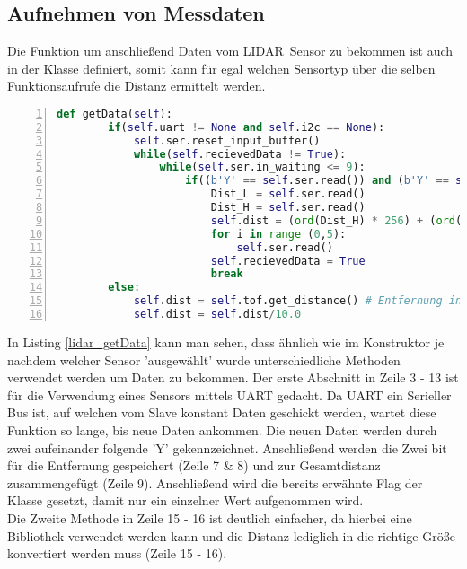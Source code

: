 \subsection{Aufnehmen von Messdaten}
Die Funktion um anschließend Daten vom \ac{LIDAR} Sensor zu bekommen ist auch in der Klasse definiert, somit kann für egal welchen Sensortyp über die selben Funktionsaufrufe die Distanz ermittelt werden. 
\begin{lstlisting}[caption={Funktion um Distanz vom \ac{LIDAR} Sensor zu erhalten}, language={Python}, label={lidar_getData}, numbers=left]
	def getData(self):
        if(self.uart != None and self.i2c == None):
            self.ser.reset_input_buffer()
            while(self.recievedData != True):
                while(self.ser.in_waiting <= 9):
                    if((b'Y' == self.ser.read()) and (b'Y' == self.ser.read())):
                        Dist_L = self.ser.read()
                        Dist_H = self.ser.read()
                        self.dist = (ord(Dist_H) * 256) + (ord(Dist_L))
                        for i in range (0,5):
                            self.ser.read()
                        self.recievedData = True
                        break
        else:
            self.dist = self.tof.get_distance() # Entfernung in mm
            self.dist = self.dist/10.0
\end{lstlisting}
In Listing \ref{lidar_getData} kann man sehen, dass ähnlich wie im Konstruktor je nachdem welcher Sensor 'ausgewählt' wurde unterschiedliche Methoden verwendet werden um Daten zu bekommen. Der erste Abschnitt in Zeile 3 - 13 ist für die Verwendung eines Sensors mittels \ac{UART} gedacht. Da \ac{UART} ein Serieller Bus ist, auf welchen vom Slave konstant Daten geschickt werden, wartet diese Funktion so lange, bis neue Daten ankommen. Die neuen Daten werden durch zwei aufeinander folgende 'Y' gekennzeichnet. Anschließend werden die Zwei bit für die Entfernung gespeichert (Zeile 7 \& 8) und zur Gesamtdistanz zusammengefügt (Zeile 9). Anschließend wird die bereits erwähnte Flag der Klasse gesetzt, damit nur ein einzelner Wert aufgenommen wird.\\
Die Zweite Methode in Zeile 15 - 16 ist deutlich einfacher, da hierbei eine Bibliothek verwendet werden kann und die Distanz lediglich in die richtige Größe konvertiert werden muss (Zeile 15 - 16).

